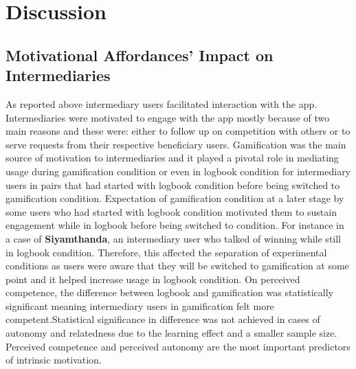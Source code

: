 \section{Discussion}
\subsection{Motivational Affordances' Impact on Intermediaries}
As reported above intermediary users facilitated interaction with the app. Intermediaries were motivated to engage with the app mostly because of two main reasons and these were: either to follow up on competition with others or to serve requests from their respective beneficiary users. Gamification was the main source of motivation to intermediaries and it played a pivotal role in mediating usage during gamification condition or even in logbook condition for intermediary users in pairs that had started with logbook condition before being switched to gamification condition. Expectation of gamification condition at a later stage by some users who had started with logbook condition motivated them to sustain engagement while in logbook before being switched to condition. For instance in a case of \textbf{Siyamthanda}, an intermediary user who talked of winning while still in logbook condition. Therefore, this affected the separation of experimental conditions as users were aware that they will be switched to gamification at some point and it helped increase usage in logbook condition. On perceived competence, the difference between logbook and gamification was statistically significant meaning intermediary users in gamification felt more competent.Statistical significance in difference was not achieved in cases of autonomy and relatedness due to the learning effect and a smaller sample size.  Perceived competence and perceived autonomy are the most important predictors of intrinsic motivation. 

